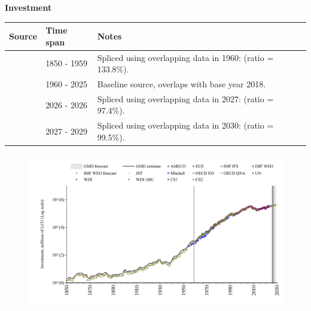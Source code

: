 \documentclass[12pt,a4paper,landscape]{article}
\begin{document}
\begin{adjustbox}{max totalsize={\paperwidth}{\paperheight},center}
\begin{minipage}[t][\textheight][t]{\textwidth}
\vspace*{0.5cm}
{}
\begin{center}
{\Large\bfseries Investment}
\end{center}
\vspace{0.5cm}
\begin{table}[H]
\centering
\small
\begin{tabular}{|l|l|l|}
\hline
\textbf{Source} & \textbf{Time span} & \textbf{Notes} \\
\hline
\rowcolor{white}\cite{CS2_ESP}& 1850 - 1959 &Spliced using overlapping data in 1960: (ratio = 133.8\%). \\
\rowcolor{lightgray}\cite{OECD_EO}& 1960 - 2025 &Baseline source, overlaps with base year 2018. \\
\rowcolor{white}\cite{AMECO}& 2026 - 2026 &Spliced using overlapping data in 2027: (ratio = 97.4\%). \\
\rowcolor{lightgray}\cite{IMF_WEO_forecast}& 2027 - 2029 &Spliced using overlapping data in 2030: (ratio = 99.5\%). \\
\hline
\end{tabular}
\end{table}
\begin{figure}[H]
\centering
\includegraphics[width=\textwidth,height=0.6\textheight,keepaspectratio]{graphs/ESP_inv.pdf}
\end{figure}
\end{minipage}
\end{adjustbox}
\end{document}
